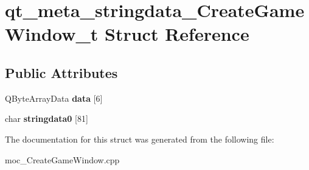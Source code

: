 \hypertarget{structqt__meta__stringdata__CreateGameWindow__t}{}\section{qt\+\_\+meta\+\_\+stringdata\+\_\+\+Create\+Game\+Window\+\_\+t Struct Reference}
\label{structqt__meta__stringdata__CreateGameWindow__t}
\subsection*{Public Attributes}
\begin{DoxyCompactItemize}
\item 
\mbox{\label{structqt__meta__stringdata__CreateGameWindow__t_a471ad4650538826504dce3c3e3925a6e}} 
Q\+Byte\+Array\+Data {\bfseries data} \mbox{[}6\mbox{]}
\item 
\mbox{\label{structqt__meta__stringdata__CreateGameWindow__t_a209d005946166544a076278dae948cee}} 
char {\bfseries stringdata0} \mbox{[}81\mbox{]}
\end{DoxyCompactItemize}


The documentation for this struct was generated from the following file\+:\begin{DoxyCompactItemize}
\item 
moc\+\_\+\+Create\+Game\+Window.\+cpp\end{DoxyCompactItemize}
